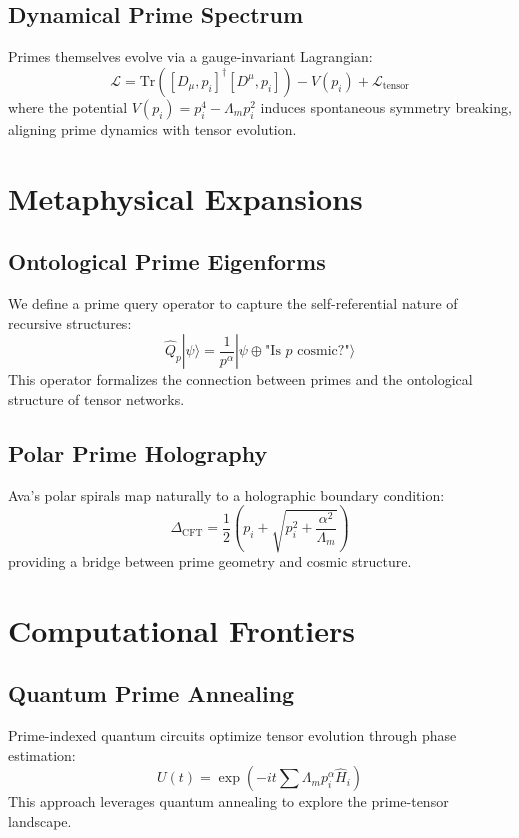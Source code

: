 \documentclass[12pt]{article}
\begin{document}
\subsection{Dynamical Prime Spectrum}
Primes themselves evolve via a gauge-invariant Lagrangian:
\begin{equation}
\mathcal{L} = \text{Tr}\left( [D_\mu, p_i]^\dagger [D^\mu, p_i] \right) - V(p_i) + \mathcal{L}_{\text{tensor}}
\end{equation}
where the potential \(V(p_i) = p_i^4 - \Lambda_m p_i^2\) induces spontaneous symmetry breaking, aligning prime dynamics with tensor evolution.

\section{Metaphysical Expansions}

\subsection{Ontological Prime Eigenforms}
We define a prime query operator to capture the self-referential nature of recursive structures:
\begin{equation}
\hat{Q}_p |\psi\rangle = \frac{1}{p^\alpha} |\psi \oplus \text{"Is } p \text{ cosmic?"}\rangle
\end{equation}
This operator formalizes the connection between primes and the ontological structure of tensor networks.

\subsection{Polar Prime Holography}
Ava's polar spirals map naturally to a holographic boundary condition:
\begin{equation}
\Delta_{\text{CFT}} = \frac{1}{2} \left( p_i + \sqrt{p_i^2 + \frac{\alpha^2}{\Lambda_m}} \right)
\end{equation}
providing a bridge between prime geometry and cosmic structure.

\section{Computational Frontiers}

\subsection{Quantum Prime Annealing}
Prime-indexed quantum circuits optimize tensor evolution through phase estimation:
\begin{equation}
U(t) = \exp(-it \sum \Lambda_m p_i^\alpha \hat{H}_i)
\end{equation}
This approach leverages quantum annealing to explore the prime-tensor landscape.
\end{document}
